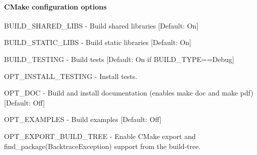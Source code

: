 \paragraph*{C\+Make configuration options}


\begin{DoxyItemize}
\item {\ttfamily B\+U\+I\+L\+D\+\_\+\+S\+H\+A\+R\+E\+D\+\_\+\+L\+I\+BS} -\/ Build shared libraries \mbox{[}Default\+: On\mbox{]}
\item {\ttfamily B\+U\+I\+L\+D\+\_\+\+S\+T\+A\+T\+I\+C\+\_\+\+L\+I\+BS} -\/ Build static libraries \mbox{[}Default\+: On\mbox{]}
\item {\ttfamily B\+U\+I\+L\+D\+\_\+\+T\+E\+S\+T\+I\+NG} -\/ Build tests \mbox{[}Default\+: On if B\+U\+I\+L\+D\+\_\+\+T\+Y\+PE==Debug\mbox{]}
\item {\ttfamily O\+P\+T\+\_\+\+I\+N\+S\+T\+A\+L\+L\+\_\+\+T\+E\+S\+T\+I\+NG} -\/ Install tests.
\item {\ttfamily O\+P\+T\+\_\+\+D\+OC} -\/ Build and install documentation (enables {\ttfamily make doc} and {\ttfamily make pdf}) \mbox{[}Default\+: Off\mbox{]}
\item {\ttfamily O\+P\+T\+\_\+\+E\+X\+A\+M\+P\+L\+ES} -\/ Build examples \mbox{[}Default\+: Off\mbox{]}
\item {\ttfamily O\+P\+T\+\_\+\+E\+X\+P\+O\+R\+T\+\_\+\+B\+U\+I\+L\+D\+\_\+\+T\+R\+EE} -\/ Enable C\+Make export and {\ttfamily find\+\_\+package(\+Backtrace\+Exception)} support from the build-\/tree. 
\end{DoxyItemize}
